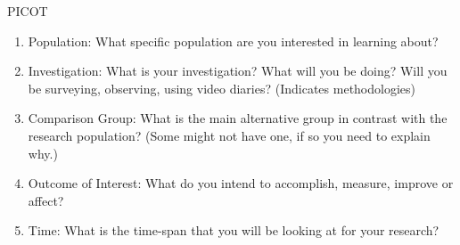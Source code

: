 \documentclass{TC}
\begin{document}
\gls{PICOT} \parencite{riva_what_2012}
\begin{enumerate}
\item Population: What specific population are you interested in learning about?
\item Investigation: What is your investigation? What will you be doing? Will you be surveying, observing, using video diaries? (Indicates methodologies)
\item Comparison Group: What is the main alternative group in contrast with the research population? (Some might not have one, if so you need to explain why.)

\item Outcome of Interest: What do you intend to accomplish, measure, improve or affect?
\item Time: What is the time-span that you will be looking at for your research? 
\end{enumerate}
\end{document}
